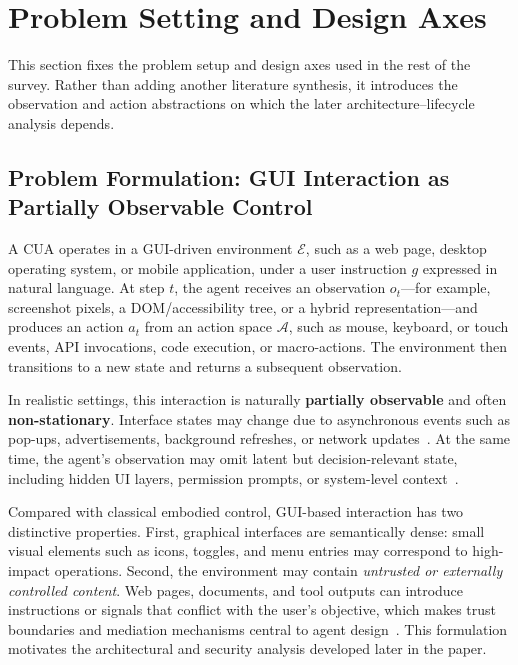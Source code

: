 \section{Problem Setting and Design Axes}
\label{sec:background}

This section fixes the problem setup and design axes used in the rest of the survey. Rather than adding another literature synthesis, it introduces the observation and action abstractions on which the later architecture--lifecycle analysis depends.

\subsection{Problem Formulation: GUI Interaction as Partially Observable Control}
A CUA operates in a GUI-driven environment $\mathcal{E}$, such as a web page, desktop operating system, or mobile application, under a user instruction $g$ expressed in natural language. At step $t$, the agent receives an observation $o_t$---for example, screenshot pixels, a DOM/accessibility tree, or a hybrid representation---and produces an action $a_t$ from an action space $\mathcal{A}$, such as mouse, keyboard, or touch events, API invocations, code execution, or macro-actions. The environment then transitions to a new state and returns a subsequent observation.

In realistic settings, this interaction is naturally \textbf{partially observable} and often \textbf{non-stationary}. Interface states may change due to asynchronous events such as pop-ups, advertisements, background refreshes, or network updates~\cite{zhou2023webarena,he2024webvoyager}. At the same time, the agent's observation may omit latent but decision-relevant state, including hidden UI layers, permission prompts, or system-level context~\cite{xie2024osworld}.

Compared with classical embodied control, GUI-based interaction has two distinctive properties. First, graphical interfaces are semantically dense: small visual elements such as icons, toggles, and menu entries may correspond to high-impact operations. Second, the environment may contain \emph{untrusted or externally controlled content}. Web pages, documents, and tool outputs can introduce instructions or signals that conflict with the user's objective, which makes trust boundaries and mediation mechanisms central to agent design~\cite{liu2025wainjectbench,foerster2026camels,zheng2026riskybench}. This formulation motivates the architectural and security analysis developed later in the paper.

